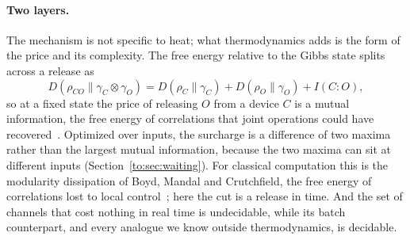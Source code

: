 \paragraph{Two layers.} The mechanism is not specific to heat; what thermodynamics adds is the form of the price and its complexity. The free energy relative to the Gibbs state splits across a release as
\begin{equation}\label{eq:split}
D(\rho_{CO}\|\gamma_C\otimes\gamma_O)=D(\rho_C\|\gamma_C)+D(\rho_O\|\gamma_O)+I(C{:}O),
\end{equation}
so at a fixed state the price of releasing $O$ from a device $C$ is a mutual information, the free energy of correlations that joint operations could have recovered~\cite{PerarnauLlobet15}. Optimized over inputs, the surcharge is a difference of two maxima rather than the largest mutual information, because the two maxima can sit at different inputs (Section~\ref{to:sec:waiting}). For classical computation this is the modularity dissipation of Boyd, Mandal and Crutchfield, the free energy of correlations lost to local control~\cite{BMC18}; here the cut is a release in time. And the set of channels that cost nothing in real time is undecidable, while its batch counterpart, and every analogue we know outside thermodynamics, is decidable.
